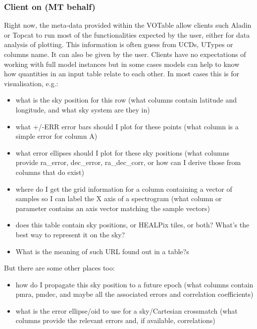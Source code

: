 \documentclass[11pt,a4paper]{ivoa}
\begin{document}
\subsubsection{Client on (MT behalf)}

Right now, the meta-data provided within the VOTable allow clients such Aladin or Topcat to run most of the functionalities expected by the user, either for data analysis of plotting.
This information is often guess from UCDs, UTypes or columns name. It can also be given by the user.
Clients have no expectations of working with full model instances but in some cases models can help to know how quantities in an input table relate to each other.
In most cases this is for visualisation, e.g.:
\begin{itemize}
    \item what is the sky position for this row
    (what columns contain latitude and longitude, and what sky system are they in)

     \item what +/-ERR error bars should I plot for these points
    (what column is a simple error for column A)

    \item what error ellipses should I plot for these sky positions
    (what columns provide ra\_error, dec\_error, ra\_dec\_corr,
     or how can I derive those from columns that do exist)

    \item where do I get the grid information for a column containing
    a vector of samples so I can label the X axis of a spectrogram
    (what column or parameter contains an axis vector matching
     the sample vectors)

    \item does this table contain sky positions, or HEALPix tiles, or both?
    What's the best way to represent it on the sky?
    
    \item What is the meaning of such URL found out in a table?s
\end{itemize}

But there are some other places too:
\begin{itemize}
    \item how do I propagate this sky position to a future epoch
    (what columns contain pmra, pmdec, and maybe all the
     associated errors and correlation coefficients)

    \item what is the error ellipse/oid to use for a sky/Cartesian crossmatch
    (what columns provide the relevant errors and, if available,
     correlations)
\end{itemize}
\end{document}
